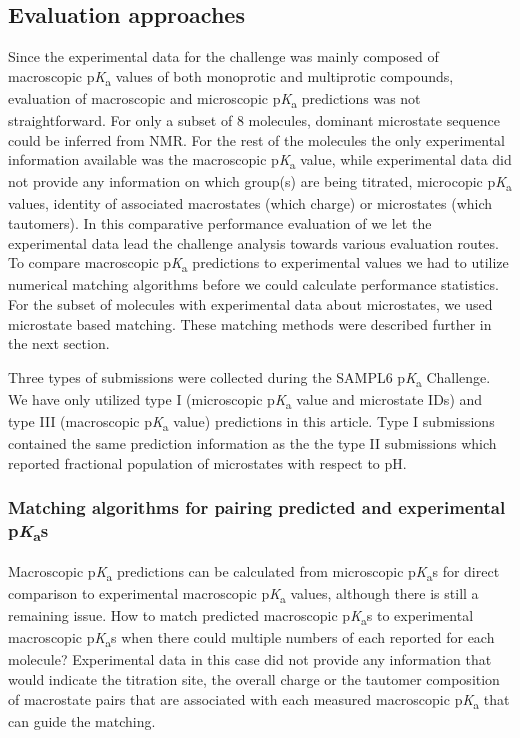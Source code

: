 \documentclass[9pt,lineno,final]{elife}
\newcommand{\pKa}{p\textit{K}\textsubscript{a}}
\begin{document}
\subsection{Evaluation approaches}

Since the experimental data for the challenge was mainly composed of macroscopic \pKa{} values of both monoprotic and multiprotic compounds, evaluation of macroscopic and microscopic \pKa{} predictions was not straightforward. For only a subset of 8 molecules, dominant microstate sequence could be inferred from NMR. For the rest of the molecules the only experimental information available was the macroscopic \pKa{} value, while experimental data did not provide any information on which group(s) are being titrated, microcopic \pKa{} values, identity of associated macrostates (which charge) or  microstates (which tautomers). In this comparative performance evaluation of we let the experimental data lead the challenge analysis towards various evaluation routes. To compare macroscopic \pKa{} predictions to experimental values we had to utilize numerical matching algorithms before we could calculate performance statistics. For the subset of molecules with experimental data about microstates, we used microstate  based matching. These matching methods were described further in the next section.

Three types of submissions were collected during the SAMPL6 \pKa{} Challenge. We have only utilized type I (microscopic \pKa{} value and microstate IDs) and type III (macroscopic \pKa{} value) predictions in this article. Type I submissions contained the same prediction information as the the type II submissions which reported fractional population of microstates with respect to pH.


\subsubsection{Matching algorithms for pairing predicted and experimental \pKa{}s}

Macroscopic \pKa{} predictions can be calculated from microscopic \pKa{}s for direct comparison to experimental macroscopic \pKa{} values, although there is still a remaining issue. 
How to match predicted macroscopic \pKa{}s to experimental macroscopic \pKa{}s when there could multiple numbers of each reported for each molecule? 
Experimental data in this case did not provide any information that would indicate the titration site, the overall charge or the tautomer composition of macrostate pairs that are associated with each measured macroscopic \pKa{} that can guide the matching.
\end{document}
